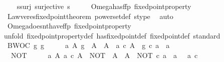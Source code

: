 \begin{isabellebody}
\ \ \isamarkupfalse%
\ s{\isacharunderscore}{\kern0pt}surj{\isacharcolon}{\kern0pt}\ {\isachardoublequoteopen}surjective\ s{\isachardoublequoteclose}\isanewline
\ \ \isamarkupfalse%
\ \isamarkupfalse%
\ Omega{\isacharunderscore}{\kern0pt}has{\isacharunderscore}{\kern0pt}ffp{\isacharcolon}{\kern0pt}\ {\isachardoublequoteopen}fixed{\isacharunderscore}{\kern0pt}point{\isacharunderscore}{\kern0pt}property\ {\isasymOmega}{\isachardoublequoteclose}\isanewline
\ \ \ \ \isamarkupfalse%
\ Lawveres{\isacharunderscore}{\kern0pt}fixed{\isacharunderscore}{\kern0pt}point{\isacharunderscore}{\kern0pt}theorem\ powerset{\isacharunderscore}{\kern0pt}def\ s{\isacharunderscore}{\kern0pt}type\ \isamarkupfalse%
\ auto\isanewline
\ \ \isamarkupfalse%
\ Omega{\isacharunderscore}{\kern0pt}doesnt{\isacharunderscore}{\kern0pt}have{\isacharunderscore}{\kern0pt}ffp{\isacharcolon}{\kern0pt}\ {\isachardoublequoteopen}{\isasymnot}{\isacharparenleft}{\kern0pt}fixed{\isacharunderscore}{\kern0pt}point{\isacharunderscore}{\kern0pt}property\ {\isasymOmega}{\isacharparenright}{\kern0pt}{\isachardoublequoteclose}\isanewline
\ \ \isamarkupfalse%
{\isacharparenleft}{\kern0pt}unfold\ fixed{\isacharunderscore}{\kern0pt}point{\isacharunderscore}{\kern0pt}property{\isacharunderscore}{\kern0pt}def\ has{\isacharunderscore}{\kern0pt}fixed{\isacharunderscore}{\kern0pt}point{\isacharunderscore}{\kern0pt}def\ fixed{\isacharunderscore}{\kern0pt}point{\isacharunderscore}{\kern0pt}def{\isacharcomma}{\kern0pt}\ standard{\isacharparenright}{\kern0pt}\ \ \ \isanewline
\ \ \ \ \isamarkupfalse%
\ BWOC{\isacharcolon}{\kern0pt}\ {\isachardoublequoteopen}{\isasymforall}g{\isachardot}{\kern0pt}\ g\ {\isacharcolon}{\kern0pt}\ {\isasymOmega}\ {\isasymrightarrow}\ {\isasymOmega}\ {\isasymlongrightarrow}\ {\isacharparenleft}{\kern0pt}{\isasymexists}a\ A{\isachardot}{\kern0pt}\ g\ {\isacharcolon}{\kern0pt}\ A\ {\isasymrightarrow}\ A\ {\isasymand}\ a\ {\isasymin}\isactrlsub c\ A\ {\isasymand}\ g\ {\isasymcirc}\isactrlsub c\ a\ {\isacharequal}{\kern0pt}\ a{\isacharparenright}{\kern0pt}{\isachardoublequoteclose}\isanewline
\ \ \ \ \isamarkupfalse%
\ \ {\isachardoublequoteopen}NOT\ {\isacharcolon}{\kern0pt}\ {\isasymOmega}\ {\isasymrightarrow}\ {\isasymOmega}\ {\isasymand}\ {\isacharparenleft}{\kern0pt}{\isasymforall}a{\isachardot}{\kern0pt}\ {\isasymforall}A{\isachardot}{\kern0pt}\ a\ {\isasymin}\isactrlsub c\ A\ {\isasymlongrightarrow}\ NOT\ {\isacharcolon}{\kern0pt}\ A\ {\isasymrightarrow}\ A\ {\isasymlongrightarrow}\ NOT\ {\isasymcirc}\isactrlsub c\ a\ {\isasymnoteq}\ a\ {\isasymor}\ {\isasymnot}\ a\ {\isasymin}\isactrlsub c\ {\isasymOmega}{\isacharparenright}{\kern0pt}{\isachardoublequoteclose}\isanewline

\end{isabellebody}
